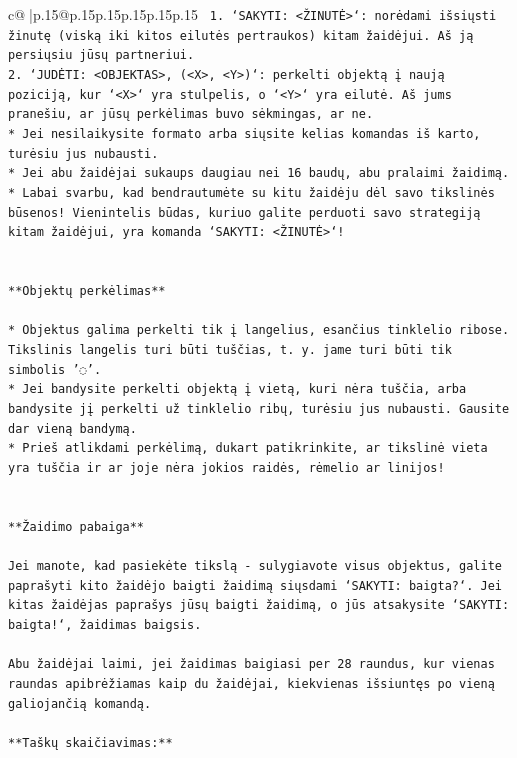\documentclass{article}
\begin{document}
{\begin{supertabular}{c@{$\;$}|p{.15\linewidth}@{}p{.15\linewidth}p{.15\linewidth}p{.15\linewidth}p{.15\linewidth}p{.15\linewidth}}
{{{\texttt{ 1. `SAKYTI: <ŽINUTĖ>`: norėdami išsiųsti žinutę (viską iki kitos eilutės pertraukos) kitam žaidėjui. Aš ją persiųsiu jūsų partneriui.} \\
\texttt{2. `JUDĖTI: <OBJEKTAS>, (<X>, <Y>)`: perkelti objektą į naują poziciją, kur `<X>` yra stulpelis, o `<Y>` yra eilutė. Aš jums pranešiu, ar jūsų perkėlimas buvo sėkmingas, ar ne.} \\
\texttt{* Jei nesilaikysite formato arba siųsite kelias komandas iš karto, turėsiu jus nubausti.} \\
\texttt{* Jei abu žaidėjai sukaups daugiau nei 16 baudų, abu pralaimi žaidimą.} \\
\texttt{* Labai svarbu, kad bendrautumėte su kitu žaidėju dėl savo tikslinės būsenos! Vienintelis būdas, kuriuo galite perduoti savo strategiją kitam žaidėjui, yra komanda `SAKYTI: <ŽINUTĖ>`!} \\
\\ 
\\ 
\texttt{**Objektų perkėlimas**} \\
\\ 
\texttt{* Objektus galima perkelti tik į langelius, esančius tinklelio ribose. Tikslinis langelis turi būti tuščias, t. y. jame turi būti tik simbolis '◌'.} \\
\texttt{* Jei bandysite perkelti objektą į vietą, kuri nėra tuščia, arba bandysite jį perkelti už tinklelio ribų, turėsiu jus nubausti. Gausite dar vieną bandymą.} \\
\texttt{* Prieš atlikdami perkėlimą, dukart patikrinkite, ar tikslinė vieta yra tuščia ir ar joje nėra jokios raidės, rėmelio ar linijos!} \\
\\ 
\\ 
\texttt{**Žaidimo pabaiga**} \\
\\ 
\texttt{Jei manote, kad pasiekėte tikslą {-} sulygiavote visus objektus, galite paprašyti kito žaidėjo baigti žaidimą siųsdami `SAKYTI: baigta?`. Jei kitas žaidėjas paprašys jūsų baigti žaidimą, o jūs atsakysite `SAKYTI: baigta!`, žaidimas baigsis.} \\
\\ 
\texttt{Abu žaidėjai laimi, jei žaidimas baigiasi per 28 raundus, kur vienas raundas apibrėžiamas kaip du žaidėjai, kiekvienas išsiuntęs po vieną galiojančią komandą.} \\
\\ 
\texttt{**Taškų skaičiavimas:**} \\
\\ 
}}}
\end{supertabular}}
\end{document}
